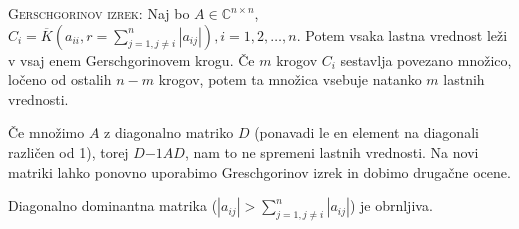 \documentclass[a4paper,10pt]{article}
\theoremstyle{definition}
\def\C{\mathbb{C}}
\begin{document}
\textsc{Gerschgorinov izrek:} Naj bo $A \in \C ^{n\times n}$, $C_i =
\overline{K}(a_{ii}, r=\sum_{j=1, j \neq i}^n | a_{ij}|), i=1,2,\ldots ,n$.
Potem vsaka lastna vrednost leži v vsaj enem Gerschgorinovem krogu. Če $m$
krogov $C_i$ sestavlja povezano množico, ločeno od ostalih $n-m$ krogov, potem
ta množica vsebuje natanko $m$ lastnih vrednosti.

Če množimo $A$ z diagonalno matriko $D$ (ponavadi le en element na diagonali
različen od 1), torej $D{-1}AD$, nam to ne spremeni lastnih vrednosti. Na novi
matriki lahko ponovno uporabimo Greschgorinov izrek in dobimo drugačne ocene.


Diagonalno dominantna matrika ($|a_{ij}| > \sum_{j=1, j\neq i}^n|a_{ij}|$) je obrnljiva.




%


\end{document}
